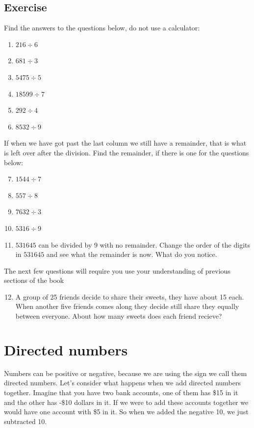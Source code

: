 \subsection{Exercise}
Find the answers to the questions below, do not use a calculator:
\begin{multicols}{2}
\begin{enumerate}
	\item $216 \div 6$
	\item $681 \div 3$
	\item $5475 \div 5$
	\item $18599 \div 7$
	\item $292 \div 4$
	\item $8532 \div 9$
\end{enumerate}
\end{multicols}
If when we have got past the last column we still have a remainder, that is what is left over after the division.
Find the remainder, if there is one for the questions below:
\begin{multicols}{2}
\begin{enumerate}
	\setcounter{enumi}{6}
	\item $1544 \div 7$
	\item $557 \div 8$
	\item $7632 \div 3$
	\item $5316 \div 9$
\end{enumerate}
\end{multicols}

\begin{enumerate}
	\setcounter{enumi}{10}
	\item $531645$ can be divided by $9$ with no remainder.  Change the order of the digits in $531645$ and see what the remainder is now.  What do you notice.
\end{enumerate}
\noindent The next few questions will require you use your understanding of previous sections of the book
\begin{enumerate}
	\setcounter{enumi}{11}
	\item A group of 25 friends decide to share their sweets, they have about 15 each.  When another five friends comes along they decide still share they equally between everyone.  About how many sweets does each friend recieve?
\end{enumerate}

\section{Directed numbers}
Numbers can be positive or negative, because we are using the sign we call them directed numbers.  Let's consider what happens when we add directed numbers together.  Imagine that you have two bank accounts, one of them has \$15 in it and the other has -\$10 dollars in it.  If we were to add these accounts together we would have one account with \$5 in it.  So when we added the negative 10, we just subtracted 10.

